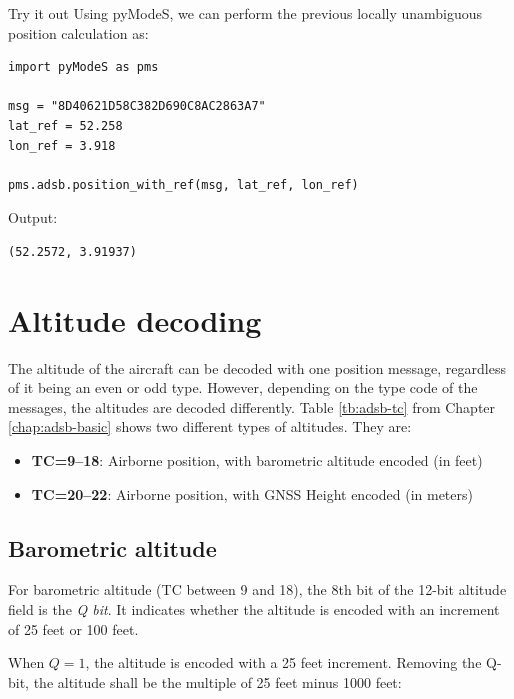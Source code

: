 
\begin{notebox}{Try it out}
Using pyModeS, we can perform the previous locally unambiguous position calculation as: 

\begin{verbatim}
import pyModeS as pms

msg = "8D40621D58C382D690C8AC2863A7"
lat_ref = 52.258
lon_ref = 3.918

pms.adsb.position_with_ref(msg, lat_ref, lon_ref)
\end{verbatim}

Output: 

\begin{verbatim}
(52.2572, 3.91937)
\end{verbatim}

\end{notebox}


\section{Altitude decoding}

The altitude of the aircraft can be decoded with one position message, regardless of it being an even or odd type. However, depending on the type code of the messages, the altitudes are decoded differently. Table \ref{tb:adsb-tc} from Chapter \ref{chap:adsb-basic} shows two different types of altitudes. They are:

\begin{itemize}
\item \textbf{TC=9--18}: Airborne position, with barometric altitude encoded (in feet)
\item \textbf{TC=20--22}: Airborne position, with GNSS Height encoded (in meters)
\end{itemize}

\subsection{Barometric altitude}
For barometric altitude (TC between 9 and 18), the 8th bit of the 12-bit altitude field is the \emph{Q bit}. It indicates whether the altitude is encoded with an increment of 25 feet or 100 feet.

When $Q=1$, the altitude is encoded with a 25 feet increment. Removing the Q-bit, the altitude shall be the multiple of 25 feet minus 1000 feet:

